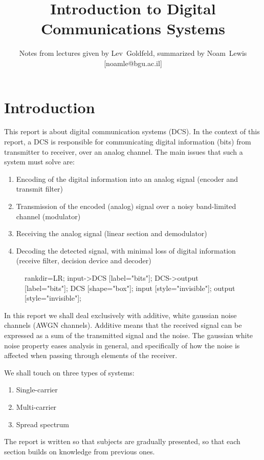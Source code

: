 \documentclass[onecolumn,x11names,technote,twoside,a4paper,12pt,english]{IEEEtran}
\begin{document}
\title{Introduction to Digital Communications Systems}
\author{Notes from lectures given by Lev~Goldfeld, summarized by Noam~Lewis [noamle@bgu.ac.il]}

\maketitle
\clearpage
\section{Introduction}
This report is about  digital communication systems (DCS). In the context of this report, a DCS is responsible for communicating digital information (bits) from transmitter to receiver, over an analog channel. The main issues that such a system must solve are:
\begin{enumerate}
\item Encoding of the digital information into an analog signal (encoder and transmit filter)
\item Transmission of the encoded (analog) signal over a noisy band-limited channel (modulator)
\item Receiving the analog signal  (linear section and demodulator)
\item Decoding the detected signal, with minimal loss of digital information (receive filter, decision device and decoder)
\end{enumerate}

\begin{figure}[h!]
  \centering
  \begin{dotpic}[width=2in]
    rankdir=LR; 
    input->DCS [label="bits\nsent"];
    DCS->output [label="bits\nreceived"];
    DCS [shape="box"];
    input [style="invisible"];
    output [style="invisible"];
  \end{dotpic}
  \label{fig:DCS}
\end{figure}

In this report we shall deal exclusively with additive, white gaussian noise channels (AWGN channels). Additive means that the received signal can be expressed as a sum of the transmitted signal and the noise. The gaussian white noise property eases analysis in general, and specifically of how the noise is affected when passing through elements of the receiver.

We shall touch on three types of systems:
\begin{enumerate}
\item Single-carrier
\item Multi-carrier
\item Spread spectrum
\end{enumerate}
The report is written so that subjects are gradually presented, so that each section builds on knowledge from previous ones.
\end{document}

